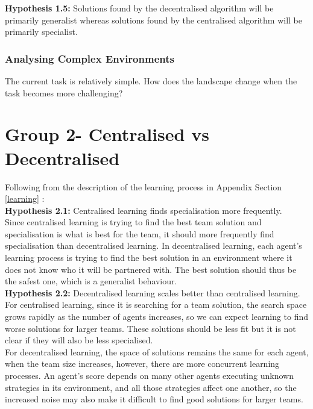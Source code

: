 \documentclass[12pt]{article}
\begin{document}
\textbf{Hypothesis 1.5:} Solutions found by the decentralised algorithm will be primarily generalist whereas solutions found by the centralised algorithm will be primarily specialist.\\

\subsubsection{Analysing Complex Environments}
The current task is relatively simple. 
How does the landscape change when the task becomes more challenging?

\section{Group 2- Centralised vs Decentralised}\label{group_2}

Following from the description of the learning process in Appendix Section \ref{learning} :\\

\textbf{Hypothesis 2.1:} Centralised learning finds specialisation more frequently. \\

Since centralised learning is trying to find the best team solution and specialisation is what is best for the team, it should more frequently find specialisation than decentralised learning. 
In decentralised learning, each agent’s learning process is trying to find the best solution in an environment where it does not know who it will be partnered with. 
The best solution should thus be the safest one, which is a generalist behaviour.\\

\textbf{Hypothesis 2.2:} Decentralised learning scales better than centralised learning. \\

For centralised learning, since it is searching for a team solution, the search space grows rapidly as the number of agents increases, so we can expect learning to find worse solutions for larger teams. 
These solutions should be less fit but it is not clear if they will also be less specialised.\\

For decentralised learning, the space of solutions remains the same for each agent, when the team size increases, however, there are more concurrent learning processes. 
An agent’s score depends on many other agents executing unknown strategies in its environment, and all those strategies affect one another, so the increased noise may also make it difficult to find good solutions for larger teams.\\
\end{document}
